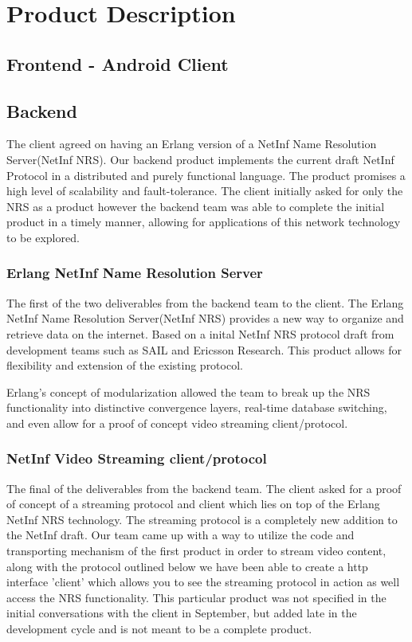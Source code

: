 \documentclass[11pt]{report}
\begin{document}
\chapter{Product Description}
\section {Frontend - Android Client}
\section {Backend}

The client agreed on having an Erlang version of a NetInf Name Resolution Server(NetInf NRS).  Our backend product implements the current draft NetInf Protocol in a distributed and purely functional language. The product promises a high level of scalability and fault-tolerance. The client initially asked for only the NRS as a product however the backend team was able to complete the initial product in a timely manner, allowing for applications of this network technology to be explored. 


\subsection {Erlang NetInf Name Resolution Server}
The first of the two deliverables from the backend team to the client. The Erlang NetInf Name Resolution Server(NetInf NRS) provides a new way to organize and retrieve data on the internet. Based on a inital NetInf NRS protocol draft from development teams such as SAIL and Ericsson Research. This product allows for flexibility and extension of the existing protocol.

Erlang's concept of modularization allowed the team to break up the NRS functionality into distinctive convergence layers, real-time database switching, and even allow for a proof of concept video streaming client/protocol. 

\subsection{NetInf Video Streaming client/protocol}

The final of the deliverables from the backend team. The client asked for a proof of concept of a streaming protocol and client which lies on top of the Erlang NetInf NRS technology. The streaming protocol is a completely new addition to the NetInf draft. Our team came up with a way to utilize the code and transporting mechanism of the first product in order to stream video content, along with the protocol outlined below we have been able to create a http interface 'client' which allows you to see the streaming protocol in action as well access the NRS functionality. This particular product was not specified in the initial conversations with the client in September, but added late in the development cycle and is not meant to be a complete product.
\end{document}
